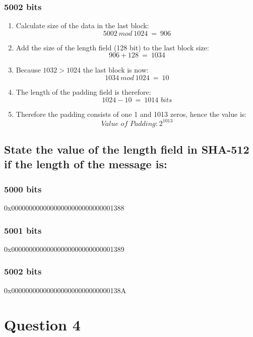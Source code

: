 \documentclass{report}
\begin{document}
			\subsubsection{5002 bits}
			\startsubsection
				\begin{enumerate}
					\item Calculate size of the data in the last block:
					\[
						5002 \ mod \ 1024 \ = \ 906
					\]
					\item Add the size of the length field (128 bit) to the last block size:
					\[
						906 + 128 \ = \ 1034
					\]
					\item Because $1032 > 1024$ the last block is now:
					\[
						1034 \ mod \ 1024 \ = \ 10
					\]
					\item The length of the padding field is therefore:
					\[
						1024 - 10 \ = \ 1014 \textit{ bits}
					\]
					\item Therefore the padding consists of one 1 and 1013 zeros, hence the value is:
					\[
						\textit{Value of Padding:} \ 2^{1013}
					\]
				\end{enumerate}
			\closesection
		\closesection
		\subsection{State the value of the length field in SHA-512 if the length of the message is:}
		\startsubsection
			\subsubsection{5000 bits}
			\startsubsection
				0x00000000000000000000000000001388
			\closesection
			\subsubsection{5001 bits}
			\startsubsection
				0x00000000000000000000000000001389
			\closesection
			\subsubsection{5002 bits}
			\startsubsection
				0x0000000000000000000000000000138A
			\closesection
		\closesection
	\closesection
	
	\section{Question 4}
	\startsection
		\renewcommand{\thesubsection}{\thesection.\Alph{subsection}}
\end{document}
